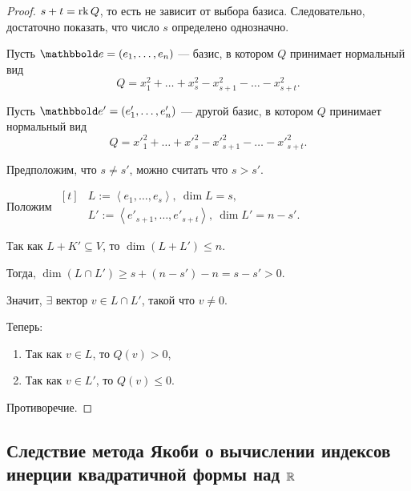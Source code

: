 \begin{proof}
    $s + t = \operatorname{\mathop{\mathrm{rk}}} Q$, то есть не зависит от выбора базиса. Следовательно, достаточно показать, что число $s$ определено однозначно.

    Пусть $\E = (e_1, \dots, e_n)$ --- базис, в котором $Q$ принимает нормальный вид
    \begin{equation*}
        Q = x_1^2 + \dots + x_s ^2 - x_{s + 1}^2 - \dots - x_{s + t}^2
    .\end{equation*}

    Пусть $\E' = (e'_1, \dots, e'_n)$ --- другой базис, в котором $Q$ принимает нормальный вид
    \begin{equation*}
        Q = x'^2_1 + \dots + x'^2_s - x'^2_{s + 1} - \dots - x'^2_{s + t}
    .\end{equation*}

    Предположим, что $s \neq s'$, можно считать что $s > s'$.

    Положим 
    \begin{math}
        \begin{aligned}[t]
            &L := \left< e_1, \dots, e_s \right>, \ \dim L = s, \\
            &L' := \left< e'_{s + 1}, \dots, e'_{s + t} \right>, \ \dim L' = n - s'.
        \end{aligned}
    \end{math}

    \bigskip
    Так как $L + K' \subseteq V$, то $\dim \left(L + L'\right) \leq n$.

    Тогда, $\dim \left(L \cap L'\right) \geq s + (n - s') - n = s - s' > 0$.

    \bigskip
    Значит, $\exists$ вектор $v \in L \cap L'$, такой что $v \neq 0$.

    Теперь: 
    \begin{enumerate}[nosep]
        \item Так как $v \in L$, то $Q(v) > 0$,
        \item Так как $v \in L'$, то $Q(v) \leq 0$.
    \end{enumerate}
 
    Противоречие.
\end{proof}


\subsection{Следствие метода Якоби о вычислении индексов инерции квадратичной формы над $\mathbb{R}$}

